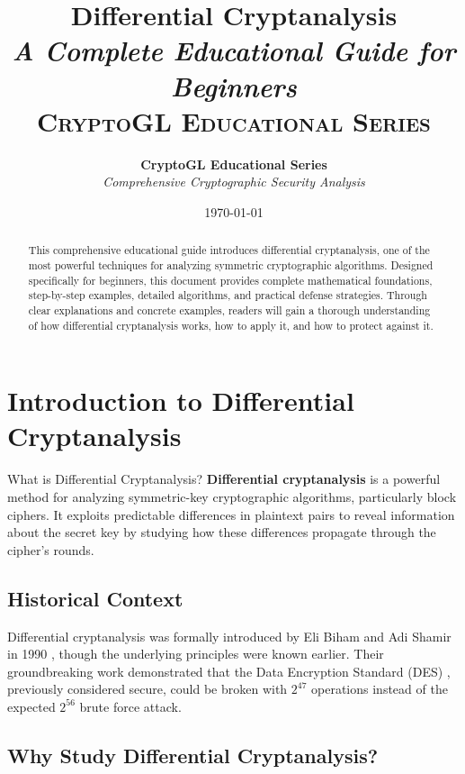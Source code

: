 \documentclass[12pt,a4paper]{article}
\title{
    \Huge\textbf{Differential Cryptanalysis} \\
    \Large\textit{A Complete Educational Guide for Beginners} \\
    \vspace{1cm}
    \textsc{\Large CryptoGL Educational Series}
}
\author{
    \textbf{CryptoGL Educational Series} \\
    \textit{Comprehensive Cryptographic Security Analysis}
}
\date{\today}
\theoremstyle{definition}
\begin{document}
\maketitle

\begin{abstract}
This comprehensive educational guide introduces differential cryptanalysis, one of the most powerful techniques for analyzing symmetric cryptographic algorithms. Designed specifically for beginners, this document provides complete mathematical foundations, step-by-step examples, detailed algorithms, and practical defense strategies. Through clear explanations and concrete examples, readers will gain a thorough understanding of how differential cryptanalysis works, how to apply it, and how to protect against it.
\end{abstract}

\tableofcontents
\newpage

\section{Introduction to Differential Cryptanalysis}

\begin{definitionbox}{What is Differential Cryptanalysis?}
\textbf{Differential cryptanalysis} is a powerful method for analyzing symmetric-key cryptographic algorithms, particularly block ciphers. It exploits predictable differences in plaintext pairs to reveal information about the secret key by studying how these differences propagate through the cipher's rounds.
\end{definitionbox}

\subsection{Historical Context}

Differential cryptanalysis was formally introduced by Eli Biham and Adi Shamir in 1990 \cite{biham1991differential}, though the underlying principles were known earlier. Their groundbreaking work demonstrated that the Data Encryption Standard (DES) \cite{nist1999des}, previously considered secure, could be broken with $2^{47}$ operations instead of the expected $2^{56}$ brute force attack.

\subsection{Why Study Differential Cryptanalysis?}
\end{document}
